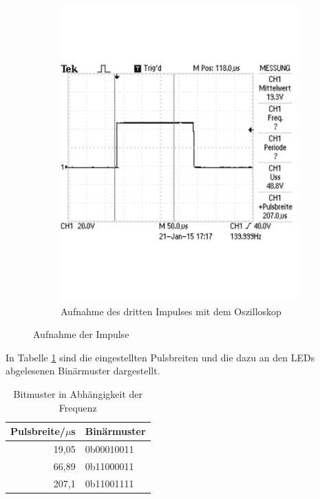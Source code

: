 \documentclass[12pt,a4paper]{article}
\begin{document}
\begin{figure}[H]
\begin{subfigure}[b]{0.45\textwidth}
\includegraphics[scale=0.4]{3_1_207.pdf}
\caption[Aufnahme des 3. Impulses mit dem Oszilloskop]{Aufnahme des dritten Impulses mit dem Oszilloskop}
\end{subfigure}
\caption[Aufnahme der Impulse]{Aufnahme der Impulse}
\label{fig:impulse}
\end{figure}
In Tabelle \ref{tab:span} sind die eingestellten Pulsbreiten und die dazu an den LEDs abgelesenen Binärmuster dargestellt.
\begin{table}[H]
\begin{center}
\begin{tabular}{|r|l|}
	\hline
	\multicolumn{1}{|l|}{Pulsbreite/{\unit{$\mu$s}}} & Binärmuster \\ \hline\hline
	                                           19,05 & 0b00010011  \\ \hline
	                                           66,89 & 0b11000011  \\ \hline
	                                           207,1 & 0b11001111  \\ \hline
\end{tabular}
\end{center}
\caption{Bitmuster in Abhängigkeit der Frequenz}
\label{tab:span}
\end{table}
\end{document}
